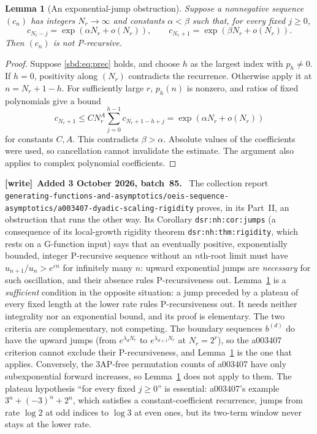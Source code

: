 \documentclass[11pt,a4paper]{article}
\newtheorem{lemma}[theorem]{Lemma}
\theoremstyle{definition}
\newenvironment{writenote}[1][]{\par\smallskip\begingroup\small
 \noindent\textbf{[write]}\if\relax\detokenize{#1}\relax\else~\textbf{#1.}\fi\ }%
 {\par\endgroup\smallskip}
\begin{document}
\begin{lemma}[An exponential-jump obstruction]\label{sbd:lem:jump}
Suppose a nonnegative sequence $(c_n)$ has integers $N_r\to\infty$ and
constants $\alpha<\beta$ such that, for every fixed $j\ge0$,
\[
 c_{N_r-j}=\exp(\alpha N_r+o(N_r)),\qquad
 c_{N_r+1}=\exp(\beta N_r+o(N_r)).
\]
Then $(c_n)$ is not P-recursive.
\end{lemma}
\begin{proof}
Suppose \eqref{sbd:eq:prec} holds, and choose $h$ as the largest index with
$p_h\ne0$. If $h=0$, positivity along $(N_r)$ contradicts the recurrence.
Otherwise apply it at $n=N_r+1-h$. For sufficiently large $r$, $p_h(n)$
is nonzero, and ratios of fixed polynomials give a bound
\[
 c_{N_r+1}\le C N_r^A\sum_{j=0}^{h-1}c_{N_r+1-h+j}
             =\exp(\alpha N_r+o(N_r))
\]
for constants $C,A$. This contradicts $\beta>\alpha$.
Absolute values of the coefficients were used, so cancellation cannot
invalidate the estimate. The argument also applies to complex
polynomial coefficients.
\end{proof}

\begin{writenote}[Added 3 October 2026, batch~85]
The collection report
\nolinkurl{generating-functions-and-asymptotics/oeis-sequence-asymptotics/a003407-dyadic-scaling-rigidity}
proves, in its Part~II, an obstruction that runs the other way. Its
Corollary \nolinkurl{dsr:nh:cor:jumps} (a consequence of its local-growth
rigidity theorem \nolinkurl{dsr:nh:thm:rigidity}, which rests on a G-function
input) says that an eventually positive, exponentially bounded, integer
P-recursive sequence without an $n$th-root limit must have
$u_{n+1}/u_n>e^{\varepsilon n}$ for infinitely many $n$: upward
exponential jumps are \emph{necessary} for such oscillation, and their
absence rules P-recursiveness out. Lemma~\ref{sbd:lem:jump} is a
\emph{sufficient} condition in the opposite situation: a jump preceded by a
plateau of every fixed length at the lower rate rules P-recursiveness out.
It needs neither integrality nor an exponential bound, and its proof is
elementary. The two criteria are complementary, not competing. The
boundary sequences $b^{(d)}$ do have the upward jumps (from
$e^{\lambda_dN_r}$ to $e^{\lambda_{d+1}N_r}$ at $N_r=2^r$), so the a003407
criterion cannot exclude their P-recursiveness, and
Lemma~\ref{sbd:lem:jump} is the one that applies. Conversely, the
3AP-free permutation counts of a003407 have only subexponential forward
increases, so Lemma~\ref{sbd:lem:jump} does not apply to them. The
plateau hypothesis ``for every fixed $j\ge0$'' is essential: a003407's
example $3^n+(-3)^n+2^n$, which satisfies a constant-coefficient
recurrence, jumps from rate $\log2$ at odd indices to $\log3$ at even
ones, but its two-term window never stays at the lower rate.
\end{writenote}
\end{document}

